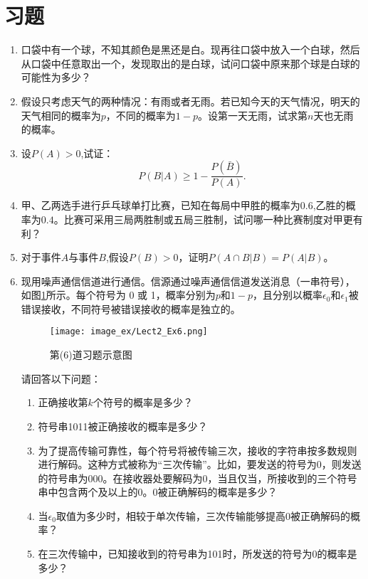 \section{习题}


    \begin{enumerate}
        \item 口袋中有一个球，不知其颜色是黑还是白。现再往口袋中放入一个白球，然后从口袋中任意取出一个，发现取出的是白球，试问口袋中原来那个球是白球的可能性为多少？

\item 假设只考虑天气的两种情况：有雨或者无雨。若已知今天的天气情况，明天的天气相同的概率为$p$，不同的概率为$1-p$。设第一天无雨，试求第$n$天也无雨的概率。

\item 设$P(A) > 0$,试证：
$$
P(B|A) \geq 1-\frac{P(\bar{B})}{P(A)}.
$$

\item 甲、乙两选手进行乒乓球单打比赛，已知在每局中甲胜的概率为$0.6$,乙胜的概率为$0.4$。比赛可采用三局两胜制或五局三胜制，试问哪一种比赛制度对甲更有利？

\item 对于事件$A$与事件$B$,假设$P(B) > 0$，证明$P(A\cap B|B) = P(A|B)$。

\item 现用噪声通信信道进行通信。信源通过噪声通信信道发送消息（一串符号），如图\ref{fig:L2Ex6}所示。每个符号为 0 或 1，概率分别为$p$和$1−p$，且分别以概率$\epsilon_0$和$\epsilon_1$被错误接收，不同符号被错误接收的概率是独立的。
\begin{figure}[htpb]
    \centering
    \texttt{[image: image\_ex/Lect2\_Ex6.png]}
    \caption{第(6)道习题示意图}
    \label{fig:L2Ex6}
\end{figure}
请回答以下问题：
\begin{enumerate}
    \item 正确接收第$k$个符号的概率是多少？
    \item 符号串1011被正确接收的概率是多少？
    \item 为了提高传输可靠性，每个符号将被传输三次，接收的字符串按多数规则进行解码。这种方式被称为“三次传输”。比如，要发送的符号为0，则发送的符号串为000。在接收器处要解码为0，当且仅当，所接收到的三个符号串中包含两个及以上的0。0被正确解码的概率是多少？
    \item 当$\epsilon_0$取值为多少时，相较于单次传输，三次传输能够提高0被正确解码的概率？
    \item 在三次传输中，已知接收到的符号串为101时，所发送的符号为0的概率是多少？
\end{enumerate}
    \end{enumerate}

